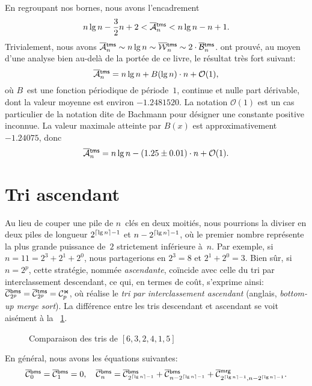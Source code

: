 En regroupant nos bornes, nous avons l'encadrement
\begin{equation*}
n\lg n - \frac{3}{2}n + 2 < \OM{\fun{tms}}{n} < n\lg n - n + 1.
\end{equation*}
Trivialement, nous avons \(\OM{\fun{tms}}{n} \sim n\lg n \sim
\OW{\fun{tms}}{n} \sim 2 \cdot \OB{\fun{tms}}{n}\).
\cite{FlajoletGolin_1994} ont prouvé, au moyen d'une analyse bien
au-delà de la portée de ce livre, le résultat très fort suivant:
\begin{equation*}
\OM{\fun{tms}}{n} = n\lg n + B(\lg n) \cdot n + \mathcal{O}(1),
\end{equation*}
où \(B\)~est une fonction périodique de période~\(1\), continue et
nulle part dérivable, dont la valeur moyenne est environ
\(-1.2481520\). La notation \(\mathcal{O}(1)\) est un cas particulier
de la notation dite de Bachmann pour désigner une constante positive
inconnue. La valeur maximale atteinte par \(B(x)\) est
approximativement \(-1.24075\), donc
\begin{equation*}
\belowdisplayskip=0pt
\OM{\fun{tms}}{n} = n\lg n - (1.25 \pm 0.01) \cdot n + \mathcal{O}(1).
\end{equation*}
  


\section{Tri ascendant}
\label{sec:general_case}

Au lieu de couper une pile de \(n\)~clés en deux moitiés, nous
pourrions la diviser en deux piles de longueur \(2^{\lceil{\lg
    n}\rceil-1}\) et \(n-2^{\lceil{\lg n}\rceil-1}\), où le premier nombre
représente la plus grande puissance de~\(2\) strictement inférieure
à~\(n\). Par exemple, si \(n=11=2^3+2^1+2^0\), nous partagerions en
\(2^3=8\) et \(2^1+2^0=3\). Bien sûr, si \(n=2^p\), cette stratégie,
nommée \emph{ascendante}, coïncide avec celle du tri par
interclassement descendant, ce qui, en termes de coût, s'exprime
ainsi: \(\OC{\fun{bms}}{2^p} = \OC{\fun{tms}}{2^p} = \C{\Join}{p}\),
où  réalise le \emph{tri par
  interclassement ascendant} (anglais, \emph{bottom-up merge
sort}). La différence entre les tris descendant et ascendant se voit
aisément à la \fig~\ref{fig:top_vs_bot}.
\begin{figure}[!b]
\centering
{}
\qquad
{}
\caption{Comparaison des tris de \([6,3,2,4,1,5]\)}
\label{fig:top_vs_bot}
\end{figure}
En général, nous avons les équations suivantes:
\begin{equation}
\OC{\fun{bms}}{0} = \OC{\fun{bms}}{1} = 0,
\quad
\OC{\fun{bms}}{n} = \OC{\fun{bms}}{2^{\ceiling{\lg n}-1}}
+ \OC{\fun{bms}}{n - 2^{\ceiling{\lg n}-1}}
+ \OC{\fun{mrg}}{2^{\ceiling{\lg n}-1},n - 2^{\ceiling{\lg n}-1}}.
\index{bms@$\OC{\fun{bms}}{n}$}
\label{eq:cost_bms}
\end{equation}

